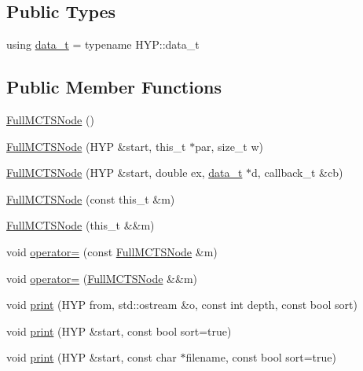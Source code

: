 \subsection*{Public Types}
\begin{DoxyCompactItemize}
\item 
using \hyperlink{class_full_m_c_t_s_node_aeb23fb7cb05ca5e9af33a43054f79574}{data\+\_\+t} = typename H\+Y\+P\+::data\+\_\+t
\end{DoxyCompactItemize}
\subsection*{Public Member Functions}
\begin{DoxyCompactItemize}
\item 
\hyperlink{class_full_m_c_t_s_node_a9604af49d0770347774d05307c744c70}{Full\+M\+C\+T\+S\+Node} ()
\item 
\hyperlink{class_full_m_c_t_s_node_af3859089eca5e60735212c979edd1bac}{Full\+M\+C\+T\+S\+Node} (H\+YP \&start, this\+\_\+t $\ast$par, size\+\_\+t w)
\item 
\hyperlink{class_full_m_c_t_s_node_a92cfc5d971a4aa3b17cd8cc5f36424d6}{Full\+M\+C\+T\+S\+Node} (H\+YP \&start, double ex, \hyperlink{class_full_m_c_t_s_node_aeb23fb7cb05ca5e9af33a43054f79574}{data\+\_\+t} $\ast$d, callback\+\_\+t \&cb)
\item 
\hyperlink{class_full_m_c_t_s_node_a13e03138d7b12e43b6e916e820869205}{Full\+M\+C\+T\+S\+Node} (const this\+\_\+t \&m)
\item 
\hyperlink{class_full_m_c_t_s_node_a1532e810a8a8e0fcb4b20fdc86e7a94e}{Full\+M\+C\+T\+S\+Node} (this\+\_\+t \&\&m)
\item 
void \hyperlink{class_full_m_c_t_s_node_aac59f75931712d329f0b2142d786d03a}{operator=} (const \hyperlink{class_full_m_c_t_s_node}{Full\+M\+C\+T\+S\+Node} \&m)
\item 
void \hyperlink{class_full_m_c_t_s_node_acc24f84f7409c127deb04945fdf0cca2}{operator=} (\hyperlink{class_full_m_c_t_s_node}{Full\+M\+C\+T\+S\+Node} \&\&m)
\item 
void \hyperlink{class_full_m_c_t_s_node_a4c246c62db3a413cbc8913dc98ec67cf}{print} (H\+YP from, std\+::ostream \&o, const int depth, const bool sort)
\item 
void \hyperlink{class_full_m_c_t_s_node_afa3770ff1034e32490c850b238fd6c2b}{print} (H\+YP \&start, const bool sort=true)
\item 
void \hyperlink{class_full_m_c_t_s_node_ace1b31902dd5a8838b52be10a224f6c4}{print} (H\+YP \&start, const char $\ast$filename, const bool sort=true)

\end{DoxyCompactItemize}
